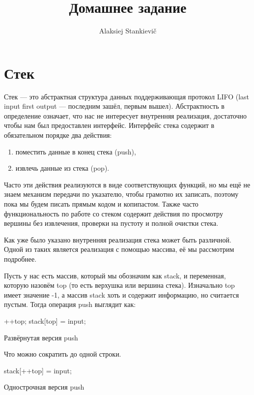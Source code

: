 \documentclass[12pt]{article}
\author{Alaksiej Stankievič}
\title{Домашнее задание}
\begin{document}

\section{Стек}
Стек --- это абстрактная структура данных поддерживающая протокол LIFO (last input first output --- последним зашёл,
первым вышел). Абстрактность в определение означает, что нас не интересует внутренняя реализация, достаточно чтобы нам
был предоставлен интерфейс. Интерфейс стека содержит в обязательном порядке два действия:
\begin{enumerate}
 \item поместить данные в конец стека (push),
 \item извлечь данные из стека (pop).
\end{enumerate}
Часто эти действия реализуются в виде соответствующих функций, но мы ещё не знаем механизм передачи по указателю, чтобы
грамотно их записать, поэтому пока мы будем писать прямым кодом и копипастом. Также часто функциональность по работе со
стеком содержит действия по просмотру вершины без извлечения, проверки на пустоту и полной очистки стека.

Как уже было указано внутренняя реализация стека может быть различной. Одной из таких является реализация с помощью
массива, её мы рассмотрим подробнее.

Пусть у нас есть массив, который мы обозначим как stack, и переменная, которую назовём top (то есть верхушка или вершина
стека). Изначально top имеет значение -1, а массив stack хоть и содержит информацию, но считается пустым.
Тогда операция push выглядит как:
\begin{listing}[H]
\begin{center}
\begin{ccode}
++top;
stack[top] = input;
\end{ccode}
\end{center}
\caption{Развёрнутая версия push}
\label{lst:pushext}
\end{listing}
Что можно сократить до одной строки.
\begin{listing}[H]
\begin{center}
\begin{ccode}
stack[++top] = input;
\end{ccode}
\end{center}
\caption{Однострочная версия push}
\label{lst:pushsingle}
\end{listing}
\end{document}
